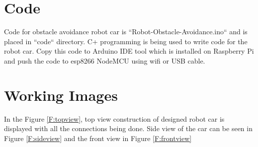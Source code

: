 \documentclass[sigconf]{acmart}
\begin{document}
\section{Code}
Code for obstacle avoidance robot car is ``Robot-Obstacle-Avoidance.ino`` and is placed in ``code`` directory. C+ programming is being used to write code for the robot car. Copy this code to Arduino IDE tool which is installed on Raspberry Pi and push the code to esp8266 NodeMCU using wifi or USB cable.

\section{Working Images}
In the Figure \ref{F:topview}, top view construction of designed robot car is displayed with all the connections being done. Side view of the car can be seen in Figure \ref{F:sideview} and the front view in Figure \ref{F:frontview}
\end{document}
